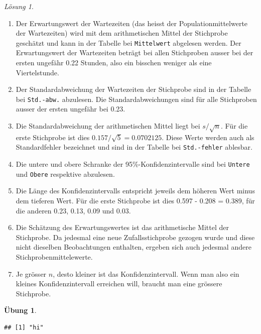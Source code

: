 \documentclass[
]{book}
\providecommand{\tightlist}{%
  \setlength{\itemsep}{0pt}\setlength{\parskip}{0pt}}
\theoremstyle{definition}
\theoremstyle{definition}
\theoremstyle{definition}
\newtheorem{exercise}{Übung}[chapter]
\theoremstyle{definition}
\theoremstyle{remark}
\newtheorem*{solution}{Lösung}
\begin{document}
\begin{solution}
\begin{enumerate}
\def\labelenumi{\alph{enumi}.}
\tightlist
\item
  Der Erwartungswert der Wartezeiten (das heisst der Populationmittelwerte der Wartezeiten) wird mit dem arithmetischen Mittel der Stichprobe geschätzt und kann in der Tabelle bei \texttt{Mittelwert} abgelesen werden. Der Erwartungswert der Wartezeiten beträgt bei allen Stichproben ausser bei der ersten ungefähr 0.22 Stunden, also ein bisschen weniger als eine Viertelstunde.
\item
  Der Standardabweichung der Wartezeiten der Stichprobe sind in der Tabelle bei \texttt{Std.-abw.} abzulesen. Die Standardabweichungen sind für alle Stichproben ausser der ersten ungefähr bei 0.23.
\item
  Die Standardabweichung der arithmetischen Mittel liegt bei \(s/\sqrt{n}\). Für die erste Stichprobe ist dies \(0.157 / \sqrt{5} = 0.0702125\). Diese Werte werden auch als Standardfehler bezeichnet und sind in der Tabelle bei \texttt{Std.-fehler} ablesbar.
\item
  Die untere und obere Schranke der 95\%-Konfidenzintervalle sind bei \texttt{Untere} und \texttt{Obere} respektive abzulesen.\\
\item
  Die Länge des Konfidenzintervalls entspricht jeweils dem höheren Wert minus dem tieferen Wert. Für die erste Stichprobe ist dies 0.597 - 0.208 = 0.389, für die anderen 0.23, 0.13, 0.09 und 0.03.
\item
  Die Schätzung des Erwartungswertes ist das arithmetische Mittel der Stichprobe. Da jedesmal eine neue Zufallsstichprobe gezogen wurde und diese nicht dieselben Beobachtungen enthalten, ergeben sich auch jedesmal andere Stichprobenmittelewerte.
\item
  Je grösser \(n\), desto kleiner ist das Konfidenzintervall. Wenn man also ein kleines Konfidenzintervall erreichen will, braucht man eine grössere Stichprobe.
\end{enumerate}

\end{solution}

\begin{exercise}
\protect\hypertarget{exr:ki-mean-s-vary}{}\label{exr:ki-mean-s-vary}\leavevmode

\begin{verbatim}
## [1] "hi"
\end{verbatim}

\end{exercise}
\end{document}
